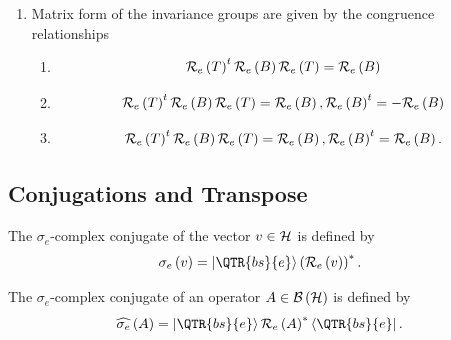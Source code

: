 \begin{enumerate}
\item Matrix form of the invariance groups are given by the congruence
relationships

\begin{enumerate}
\item 
\begin{equation}
{\cal R}_{e}\left( T\right) ^{t}{\cal R}_{e}\left( B\right) {\cal R}%
_{e}\left( T\right) ={\cal R}_{e}\left( B\right)
\end{equation}

\item 
\begin{equation}
{\cal R}_{e}\left( T\right) ^{t}{\cal R}_{e}\left( B\right) {\cal R}%
_{e}\left( T\right) ={\cal R}_{e}\left( B\right) ,{\cal R}_{e}\left(
B\right) ^{t}=-{\cal R}_{e}\left( B\right)
\end{equation}

\item 
\begin{equation}
{\cal R}_{e}\left( T\right) ^{t}{\cal R}_{e}\left( B\right) {\cal R}%
_{e}\left( T\right) ={\cal R}_{e}\left( B\right) ,{\cal R}_{e}\left(
B\right) ^{t}={\cal R}_{e}\left( B\right) .
\end{equation}
\end{enumerate}
\end{enumerate}

\subsection{Conjugations and Transpose}

\begin{definition}
The $\sigma _{e}$-complex conjugate of the vector $v\in {\cal H}$ is defined
by 
\begin{equation}
\sigma _{e}\left( v\right) =\left\vert \QTR{bs}{e}\right\rangle \left( {\cal %
R}_{e}\left( v\right) \right) ^{\ast }.
\end{equation}
\end{definition}

\begin{definition}
The $\sigma _{e}$-complex conjugate of an operator $A\in {\cal B}\left( 
{\cal H}\right) $ is defined by 
\begin{equation}
\widehat{\sigma _{e}}\left( A\right) =\left\vert \QTR{bs}{e}\right\rangle 
{\cal R}_{e}\left( A\right) ^{\ast }\left\langle \QTR{bs}{e}\right\vert .
\end{equation}
\end{definition}

